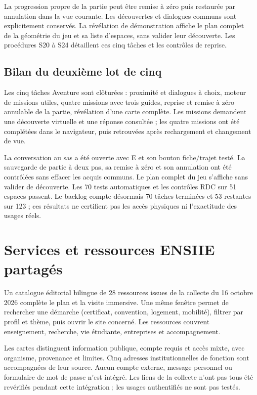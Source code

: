 \documentclass[11pt,a4paper]{article}
\begin{document}
La progression propre de la partie peut être remise à zéro puis restaurée par annulation dans la vue courante. Les découvertes et dialogues communs sont explicitement conservés. La révélation de démonstration affiche le plan complet de la géométrie du jeu et sa liste d'espaces, sans valider leur découverte. Les procédures S20 à S24 détaillent ces cinq tâches et les contrôles de reprise.

\subsection{Bilan du deuxième lot de cinq}
Les cinq tâches Aventure sont clôturées : proximité et dialogues à choix, moteur de missions utiles, quatre missions avec trois guides, reprise et remise à zéro annulable de la partie, révélation d'une carte complète. Les missions demandent une découverte virtuelle et une réponse consultée ; les quatre missions ont été complétées dans le navigateur, puis retrouvées après rechargement et changement de vue.

La conversation au sas a été ouverte avec E et son bouton fiche/trajet testé. La sauvegarde de partie à deux pas, sa remise à zéro et son annulation ont été contrôlées sans effacer les acquis communs. Le plan complet du jeu s'affiche sans valider de découverte. Les 70 tests automatiques et les contrôles RDC sur 51 espaces passent. Le backlog compte désormais 70 tâches terminées et 53 restantes sur 123 ; ces résultats ne certifient pas les accès physiques ni l'exactitude des usages réels.

\section{Services et ressources ENSIIE partagés}
Un catalogue éditorial bilingue de 28 ressources issues de la collecte du 16 octobre 2026 complète le plan et la visite immersive. Une même fenêtre permet de rechercher une démarche (certificat, convention, logement, mobilité), filtrer par profil et thème, puis ouvrir le site concerné. Les ressources couvrent enseignement, recherche, vie étudiante, entreprises et accompagnement.

Les cartes distinguent information publique, compte requis et accès mixte, avec organisme, provenance et limites. Cinq adresses institutionnelles de fonction sont accompagnées de leur source. Aucun compte externe, message personnel ou formulaire de mot de passe n'est intégré. Les liens de la collecte n'ont pas tous été revérifiés pendant cette intégration ; les usages authentifiés ne sont pas testés.
\end{document}
